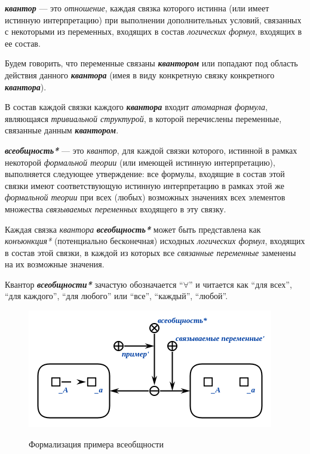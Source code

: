 \begin{SCn}
\end{SCn}

\textbf{\textit{квантор}} — это \textit{отношение}, каждая связка которого истинна (или имеет истинную интерпретацию) при выполнении дополнительных условий, связанных с некоторыми из переменных, входящих в состав \textit{логических формул}, входящих в ее состав.

Будем говорить, что переменные связаны \textbf{\textit{квантором}} или попадают под область действия данного \textbf{\textit{квантора}} (имея в виду конкретную связку конкретного \textbf{\textit{квантора}}).

В состав каждой связки каждого \textbf{\textit{квантора}} входит \textit{атомарная формула}, являющаяся \textit{тривиальной структурой}, в которой перечислены переменные, связанные данным \textbf{\textit{квантором}}.

\begin{SCn}
\end{SCn}

\textbf{\textit{всеобщность*}} --- это \textit{квантор}, для каждой связки которого, истинной в рамках некоторой \textit{формальной теории} (или имеющей истинную интерпретацию), выполняется следующее утверждение: все формулы, входящие в состав этой связки имеют соответствующую истинную интерпретацию в рамках этой же \textit{формальной теории} при всех (любых) возможных значениях всех элементов множества \textit{связываемых переменных\scnrolesign} входящего в эту связку.

Каждая связка \textit{квантора} \textbf{\textit{всеобщность*}} может быть представлена как \textit{конъюнкция*} (потенциально бесконечная) исходных \textit{логических формул}, входящих в состав этой связки, в каждой из которых все \textit{связанные переменные\scnrolesign} заменены на их возможные значения.

Квантор \textbf{\textit{всеобщности*}} зачастую обозначается ``$\forall$'' и читается как ``для всех'', ``для каждого'', ``для любого'' или ``все'', ``каждый'', ``любой''.

\begin{figure}[H]
\caption{Формализация примера всеобщности}
\includegraphics[scale=0.8]{author/part2/figures/logic/universality.png}
\label{fig:universality}
\end{figure}

